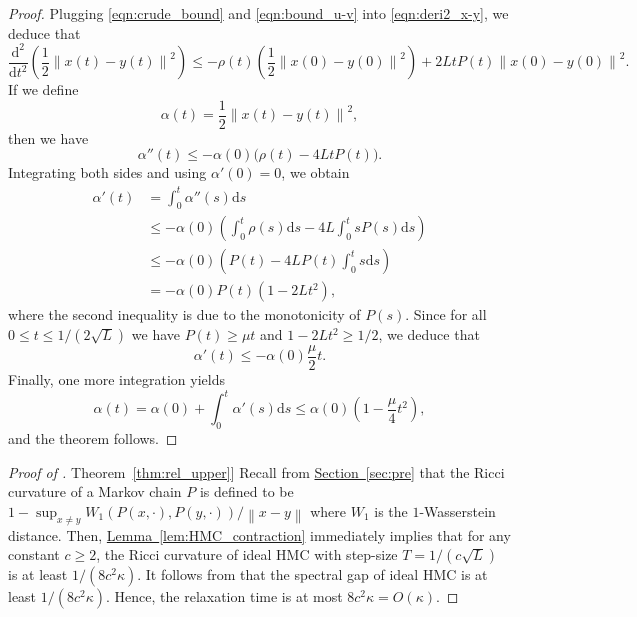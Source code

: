 \documentclass[11pt]{article}
\numberwithin{equation}{section}
\theoremstyle{definition}
\theoremstyle{plain}
\newcommand{\expref}[2]{\hyperref[#2]{#1~\ref{#2}}}
\newcommand{\dif}{\mathrm{d}}
\newcommand{\norm}[1]{\left\lVert #1 \right\rVert}
\begin{document}
\begin{proof}
	Plugging \eqref{eqn:crude_bound} and \eqref{eqn:bound_u-v} into \eqref{eqn:deri2_x-y}, we deduce that
	\begin{equation*}
		\frac{\dif^2}{\dif t^2} \left( \frac{1}{2} \norm{x(t)-y(t)}^2 \right) 
		\le - \rho(t) \left( \frac{1}{2} \norm{x(0) - y(0)}^2 \right) + 2Lt P(t) \norm{x(0)-y(0)}^2. 
	\end{equation*}
	If we define
	\[
	\alpha(t) = \frac{1}{2} \norm{x(t)-y(t)}^2, 
	\]
	then we have 
	\[
	\alpha''(t) \le - \alpha(0) \big( \rho(t)  - 4L t P(t) \big).
	\]
	Integrating both sides and using $\alpha'(0) = 0$, we obtain
	\begin{align*}
		\alpha'(t) &= \int_{0}^t \alpha''(s) \dif s\\ 
		&\le - \alpha(0) \left( \int_{0}^t \rho(s) \dif s - 4L \int_{0}^t sP(s) \dif s \right)\\ 
		&\le - \alpha(0) \left( P(t) - 4L P(t) \int_{0}^t s \dif s \right)\\ 
		&= - \alpha(0) P(t) \left( 1 - 2Lt^2 \right), 
	\end{align*}
	where the second inequality is due to the monotonicity of $P(s)$. 
	Since for all $0\le t\le 1/(2\sqrt{L})$ we have $P(t) \ge \mu t$ and $1-2Lt^2 \ge 1/2$, we deduce that
	\[
	\alpha'(t) \le - \alpha(0) \frac{\mu}{2} t.
	\]
	Finally, one more integration yields
	\[
	\alpha(t) = \alpha(0) + \int_{0}^t \alpha'(s) \dif s \le \alpha(0) \left( 1 - \frac{\mu}{4} t^2 \right), 
	\]
	and the theorem follows.
\end{proof}

\begin{proof}[Proof of \expref{Theorem}{thm:rel_upper}]
	Recall from \expref{Section}{sec:pre} that the Ricci curvature of a Markov chain $P$ is defined to be 
	$1 - \sup_{x\neq y} W_1(P(x, \cdot), P(y, \cdot)) / \norm{x-y}$ where $W_1$ is the $1$-Wasserstein distance. 
	Then, \expref{Lemma}{lem:HMC_contraction} immediately implies that for any constant $c\ge 2$, the Ricci curvature of ideal HMC with step-size $T=1/(c\sqrt{L})$ is at least $1/(8c^2\kappa)$. 
	It follows from \cite[Proposition 29]{O09} that the spectral gap of ideal HMC is at least $1/(8c^2\kappa)$. Hence, the relaxation time is
%
at most   %
$8c^2\kappa = O(\kappa)$.
\end{proof}
\end{document}
